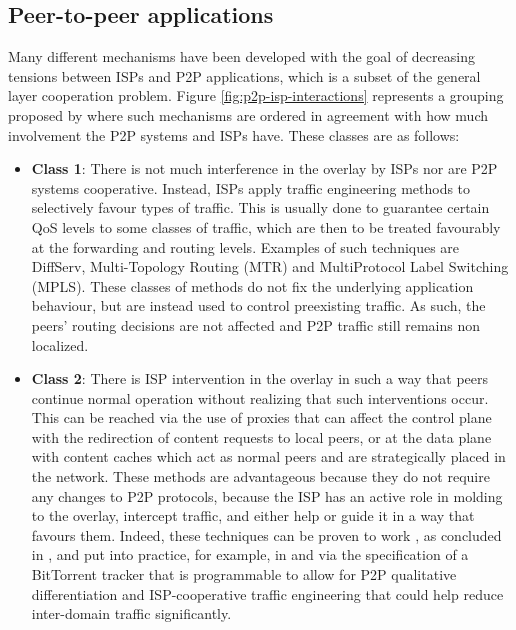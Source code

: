 \subsection{Peer-to-peer applications}

    Many different mechanisms have been developed with the goal of decreasing tensions between ISPs and P2P applications, which is a subset of the general layer cooperation problem.
    Figure \ref{fig:p2p-isp-interactions} represents a grouping proposed by \cite{dan-Commag10} where such mechanisms are ordered in agreement with how much involvement the P2P systems and ISPs have. These classes are as follows:

    \begin{itemize}
        \item \textbf{Class 1}:
            There is not much interference in the overlay by ISPs nor are P2P systems cooperative.
            Instead, ISPs apply traffic engineering methods to selectively favour types of traffic.
            This is usually done to guarantee certain QoS levels to some classes of traffic, which are then to be treated favourably at the forwarding and routing levels.
            Examples of such techniques are DiffServ, Multi-Topology Routing (MTR) and MultiProtocol Label Switching (MPLS).
            These classes of methods do not fix the underlying application behaviour, but are instead used to control preexisting traffic.
            As such, the peers' routing decisions are not affected and P2P traffic still remains non localized.
        \item \textbf{Class 2}:
            There is ISP intervention in the overlay in such a way that peers continue normal operation without realizing that such interventions occur.
            This can be reached via the use of proxies that can affect the control plane with the redirection of content requests to local peers, or at the data plane with content caches which act as normal peers and are strategically placed in the network.
            These methods are advantageous because they do not require any changes to P2P protocols, because the ISP has an active role in molding to the overlay, intercept traffic, and either help or guide it in a way that favours them.
            Indeed, these techniques can be proven to work , as concluded in \cite{dan-Commag10}, and put into practice, for example, in \cite{programmable-trackers} and \cite{configurable-trackers} via the specification of a BitTorrent tracker that is programmable to allow for P2P qualitative differentiation and ISP-cooperative traffic engineering that could help reduce inter-domain traffic significantly.

\end{itemize}
